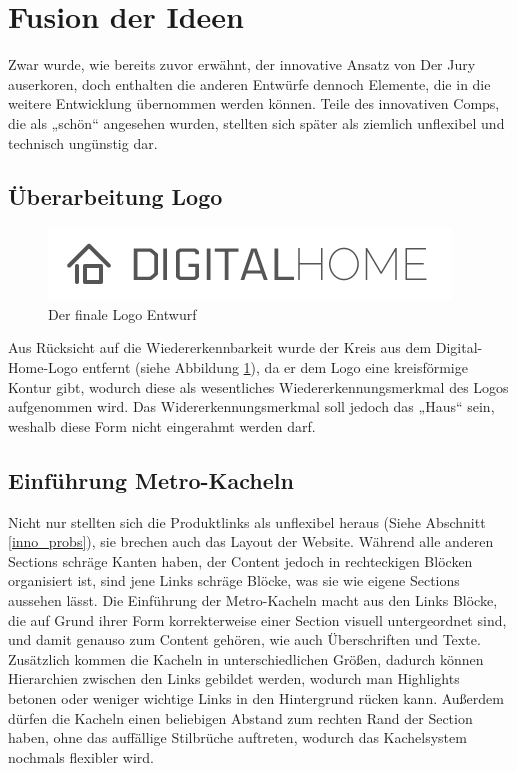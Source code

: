 \section{Fusion der Ideen}
Zwar wurde, wie bereits zuvor erwähnt, der innovative Ansatz von Der Jury auserkoren, doch enthalten die anderen Entwürfe dennoch Elemente, die in die weitere Entwicklung übernommen werden können. Teile des innovativen Comps, die als „schön“ angesehen wurden, stellten sich später als ziemlich unflexibel und technisch ungünstig dar.
\subsection{Überarbeitung Logo}
\begin{figure} [hp]
\includegraphics[width=\textwidth]{./img/logo3.png}
\caption{Der finale Logo Entwurf}
\label{logo3}
\end{figure}
Aus Rücksicht auf die Wiedererkennbarkeit wurde der Kreis aus dem Digital-Home-Logo entfernt (siehe Abbildung \ref{logo3}), da er dem Logo eine kreisförmige Kontur gibt, wodurch diese als wesentliches Wiedererkennungsmerkmal des Logos aufgenommen wird. Das Widererkennungsmerkmal soll jedoch das „Haus“ sein, weshalb diese Form nicht eingerahmt werden darf.

\subsection{Einführung Metro-Kacheln}
Nicht nur stellten sich die Produktlinks als unflexibel heraus (Siehe Abschnitt \ref{inno_probs}), sie brechen auch das Layout der Website. Während alle anderen Sections schräge Kanten haben, der Content jedoch in rechteckigen Blöcken organisiert ist, sind jene Links schräge Blöcke, was sie wie eigene Sections aussehen lässt. Die Einführung der Metro-Kacheln macht aus den Links Blöcke, die auf Grund ihrer Form korrekterweise einer Section visuell untergeordnet sind, und damit genauso zum Content gehören, wie auch Überschriften und Texte. Zusätzlich kommen die Kacheln in unterschiedlichen Größen, dadurch können Hierarchien zwischen den Links gebildet werden, wodurch man Highlights betonen oder weniger wichtige Links in den Hintergrund rücken kann. Außerdem dürfen die Kacheln einen beliebigen Abstand zum rechten Rand der Section haben, ohne das auffällige Stilbrüche auftreten, wodurch das Kachelsystem nochmals flexibler wird.

